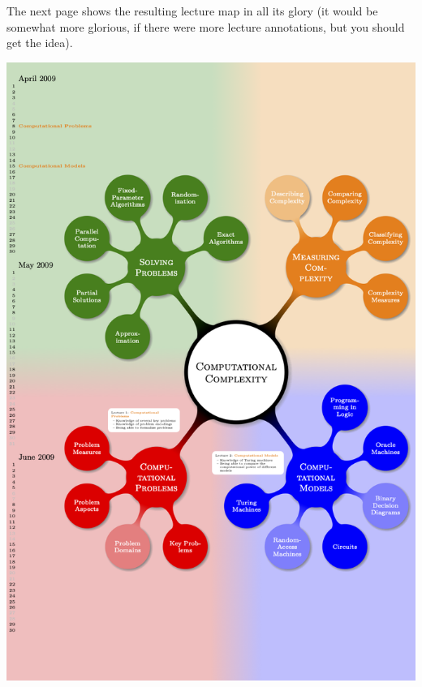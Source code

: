 The next page shows the resulting lecture map in all its glory (it
would be somewhat more glorious, if there were more lecture
annotations, but you should get the idea).

\includegraphics[width=\linewidth]{standalone/map-final.png}


